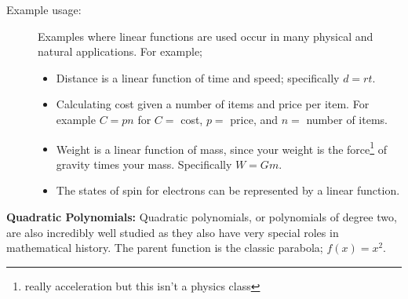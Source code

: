\documentclass{ximeraXloud}
\begin{document}
\begin{description}
            \item[Example usage:] Examples where linear functions are used occur in many physical and natural applications. For example;
            \begin{itemize}
                \item Distance is a linear function of time and speed; specifically $d = rt$.
                \item Calculating cost given a number of items and price per item. For example $C = pn$ for $C = $ cost, $p = $ price, and $n = $ number of items.
                \item Weight is a linear function of mass, since your weight is the force\footnote{really acceleration but this isn't a physics class} of gravity times your mass. Specifically $W = Gm$.
                \item The states of spin for electrons can be represented by a linear function.
            \end{itemize}
        \end{description}
        
        \textbf{Quadratic Polynomials:} Quadratic polynomials, or polynomials of degree two, are also incredibly well studied as they also have very special roles in mathematical history. The parent function is the classic parabola; $f(x) = x^2$. 
        
\end{document}
